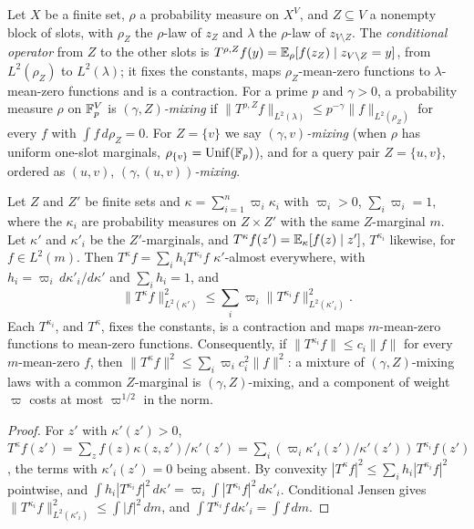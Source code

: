 \begin{definition}\label{def:mixing}
Let $X$ be a finite set, $\rho$ a probability measure on $X^V$, and $Z\subseteq V$
a nonempty block of slots, with $\rho_Z$ the $\rho$-law of $z_Z$ and $\lambda$
the $\rho$-law of $z_{V\setminus Z}$. The \emph{conditional operator} from $Z$
to the other slots is
$T^{\rho,Z}f(y)=\mathbb E_\rho[f(z_Z)\mid z_{V\setminus Z}=y]$, from $L^2(\rho_Z)$ to
$L^2(\lambda)$; it fixes the constants, maps $\rho_Z$-mean-zero functions to
$\lambda$-mean-zero functions and is a contraction. For a prime $p$ and
$\gamma>0$, a probability measure $\rho$ on $\mathbb F_p^V$ is
\emph{$(\gamma,Z)$-mixing} if $\|T^{\rho,Z}f\|_{L^2(\lambda)}\le p^{-\gamma}
\|f\|_{L^2(\rho_Z)}$ for every $f$ with $\int f\,d\rho_Z=0$. For $Z=\{v\}$ we say
\emph{$(\gamma,v)$-mixing} (when $\rho$ has uniform one-slot marginals,
$\rho_{\{v\}}=\operatorname{Unif}(\mathbb F_p)$), and for a query pair $Z=\{u,v\}$, ordered as
$(u,v)$, \emph{$(\gamma,(u,v))$-mixing}.
\end{definition}

\begin{lemma}[Mixtures]\label{lem:mixture}
Let $Z$ and $Z'$ be finite sets and $\kappa=\sum_{i=1}^n\varpi_i\kappa_i$ with
$\varpi_i>0$, $\sum_i\varpi_i=1$, where the $\kappa_i$ are probability measures on
$Z\times Z'$ with the same $Z$-marginal $m$. Let $\kappa'$ and $\kappa'_i$ be the
$Z'$-marginals, and $T^\kappa f(z')=\mathbb E_\kappa[f(z)\mid z']$, $T^{\kappa_i}$
likewise, for $f\in L^2(m)$. Then $T^\kappa f=\sum_ih_iT^{\kappa_i}f$
$\kappa'$-almost everywhere, with $h_i=\varpi_i\,d\kappa'_i/d\kappa'$ and
$\sum_ih_i=1$, and
\[
 \|T^\kappa f\|^2_{L^2(\kappa')}\le\sum_i\varpi_i\|T^{\kappa_i}f\|^2_{L^2(\kappa'_i)} .
\]
Each $T^{\kappa_i}$, and $T^\kappa$, fixes the constants, is a contraction and
maps $m$-mean-zero functions to mean-zero functions. Consequently, if
$\|T^{\kappa_i}f\|\le c_i\|f\|$ for every $m$-mean-zero $f$, then
$\|T^\kappa f\|^2\le\sum_i\varpi_ic_i^2\|f\|^2$: a mixture of $(\gamma,Z)$-mixing
laws with a common $Z$-marginal is $(\gamma,Z)$-mixing, and a component of
weight $\varpi$ costs at most $\varpi^{1/2}$ in the norm.
\end{lemma}

\begin{proof}
For $z'$ with $\kappa'(z')>0$,
$T^\kappa f(z')=\sum_zf(z)\kappa(z,z')/\kappa'(z')=\sum_i(\varpi_i\kappa'_i(z')/
\kappa'(z'))\,T^{\kappa_i}f(z')$, the terms with $\kappa'_i(z')=0$ being absent.
By convexity $|T^\kappa f|^2\le\sum_ih_i|T^{\kappa_i}f|^2$ pointwise, and
$\int h_i|T^{\kappa_i}f|^2\,d\kappa'=\varpi_i\int|T^{\kappa_i}f|^2\,d\kappa'_i$.
Conditional Jensen gives $\|T^{\kappa_i}f\|^2_{L^2(\kappa'_i)}\le\int|f|^2\,dm$,
and $\int T^{\kappa_i}f\,d\kappa'_i=\int f\,dm$.
\end{proof}

